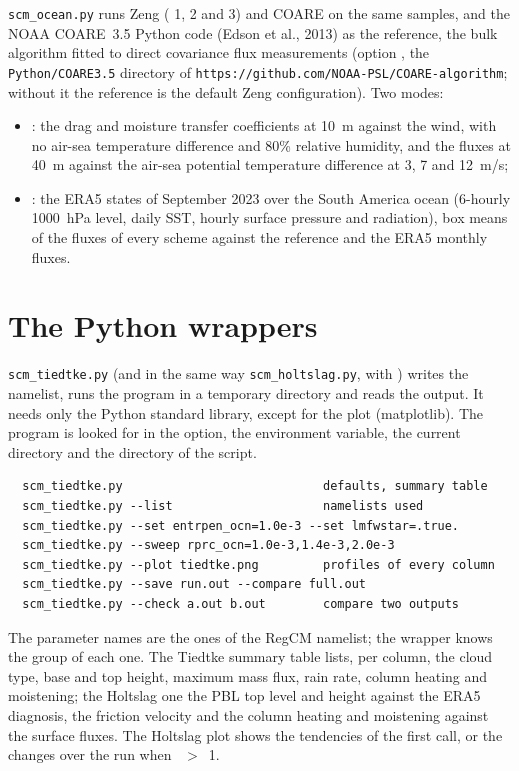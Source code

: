 \verb=scm_ocean.py= runs Zeng ( 1, 2 and 3) and COARE on
the same samples, and the NOAA COARE~3.5 Python code (Edson et al.,
2013) as the reference, the bulk
algorithm fitted to direct covariance flux measurements (option
, the \verb=Python/COARE3.5= directory of
\verb=https://github.com/NOAA-PSL/COARE-algorithm=; without it the
reference is the default Zeng configuration). Two modes:
\begin{itemize}
  \item {}: the drag and moisture transfer coefficients at
        10~m against the wind, with no air-sea temperature difference
        and 80\% relative humidity, and the fluxes at 40~m against the
        air-sea potential temperature difference at 3, 7 and 12~m/s;
  \item {}: the ERA5 states of September 2023 over the South
        America ocean (6-hourly 1000~hPa level, daily SST, hourly
        surface pressure and radiation), box means of the fluxes of every
        scheme against the reference and the ERA5 monthly fluxes.
\end{itemize}

\section{The Python wrappers}

\verb=scm_tiedtke.py= (and in the same way \verb=scm_holtslag.py=, with
) writes the namelist, runs the program in a temporary
directory and reads the output. It needs only the Python standard library,
except for the plot (matplotlib). The program is looked for in the
 option, the  environment variable, the
current directory and the directory of the script.
\begin{verbatim}
  scm_tiedtke.py                            defaults, summary table
  scm_tiedtke.py --list                     namelists used
  scm_tiedtke.py --set entrpen_ocn=1.0e-3 --set lmfwstar=.true.
  scm_tiedtke.py --sweep rprc_ocn=1.0e-3,1.4e-3,2.0e-3
  scm_tiedtke.py --plot tiedtke.png         profiles of every column
  scm_tiedtke.py --save run.out --compare full.out
  scm_tiedtke.py --check a.out b.out        compare two outputs
\end{verbatim}
The parameter names are the ones of the RegCM namelist; the wrapper knows
the group of each one. The Tiedtke summary table lists, per column, the
cloud type, base and top height, maximum mass flux, rain rate, column
heating and moistening; the Holtslag one the PBL top level and height
against the ERA5 diagnosis, the friction velocity and the column heating
and moistening against the surface fluxes. The Holtslag plot shows the
tendencies of the first call, or the changes over the run when
~$>$~1.

